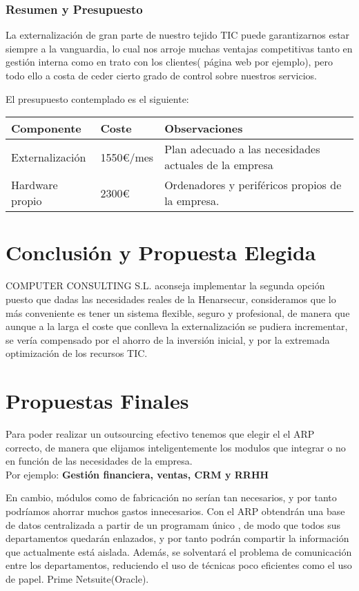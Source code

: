 \documentclass[12pt,letterpaper]{article}
\begin{document}
	\subsubsection{Resumen y Presupuesto}
	La externalización de gran parte de nuestro tejido TIC puede garantizarnos estar siempre a la vanguardia, lo cual nos arroje muchas ventajas competitivas tanto en gestión interna como en trato con los clientes( página web por ejemplo), pero todo ello a costa de ceder cierto grado de control sobre nuestros servicios.\par
	El presupuesto contemplado es el siguiente:
	\begin{center}
    \begin{tabular}{ | l | l | p{7cm} |}
    \hline
    Componente & Coste & Observaciones \\ \hline
    Externalización & 1550€/mes & Plan adecuado a las necesidades actuales de la empresa \\ \hline
    Hardware propio & 2300€ & Ordenadores y periféricos propios de la empresa. \\ \hline
    \end{tabular}
	\end{center}
	
	\section{Conclusión y Propuesta Elegida}
	COMPUTER CONSULTING S.L. aconseja implementar la segunda opción puesto que dadas las necesidades reales de la Henarsecur, consideramos que lo más conveniente es tener un sistema flexible, seguro y profesional, de manera que aunque a la larga el coste que conlleva la externalización se pudiera incrementar, se vería compensado por el ahorro de la inversión inicial, y por la extremada optimización de los recursos TIC.


	\section{Propuestas Finales}
	Para poder realizar un outsourcing efectivo tenemos que elegir el
	el ARP correcto, de manera que elijamos inteligentemente los
	modulos que integrar o no en función de las necesidades de la empresa.\\ Por ejemplo: 		  \textbf{Gestión financiera, ventas, CRM y RRHH}
	
	
	 En cambio, módulos como de fabricación no serían tan necesarios, y por tanto podríamos ahorrar muchos gastos innecesarios.
	Con el ARP obtendrán una base de datos centralizada a partir de un programam único , de modo que todos sus departamentos quedarán enlazados, y por tanto podrán compartir la información que actualmente está aislada. Además, se solventará el problema de comunicación entre los departamentos, reduciendo el uso de técnicas poco eficientes como el uso de papel.
	Prime
	Netsuite(Oracle).
	
\end{document}
